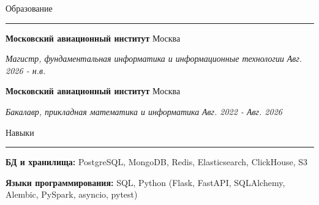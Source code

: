 \documentclass[14pt, a4paper, oneside]{extarticle}
\begin{document}
\begin{flushleft}
	\vspace{-\intextsep}
	\large Образование
\end{flushleft}

\vspace{-0.8\intextsep}
\hrule


\begin{flushleft}
	\vspace{-0.8\intextsep}
	\quad
	\textbf{Московский авиационный институт}
	\hfill
	Москва
\end{flushleft}

\begin{flushleft}
	\vspace{-\intextsep}
	\quad
	\textit{\footnotesize Магистр, фундаментальная информатика и информационные технологии} 
	\hfill
	\textit{\small Авг. 2026 - н.в.}
\end{flushleft}


\begin{flushleft}
	\vspace{-0.8\intextsep}
	\quad
	\textbf{Московский авиационный институт}
	\hfill
	Москва
\end{flushleft}

\begin{flushleft}
	\vspace{-\intextsep}
	\quad
	\textit{Бакалавр, прикладная математика и информатика}
	\hfill
	\textit{\small Авг. 2022 - Авг. 2026}
\end{flushleft}


\begin{flushleft}
	\vspace{-\intextsep}
	\large Навыки
\end{flushleft}

\vspace{-0.8\intextsep}
\hrule


\vspace{0.5\intextsep}

\textbf{БД и хранилища:} PostgreSQL, MongoDB, Redis, Elasticsearch, ClickHouse, S3

\textbf{Языки программирования:} SQL, Python (Flask, FastAPI, SQLAlchemy, Alembic, PySpark, asyncio, pytest)
\end{document}
